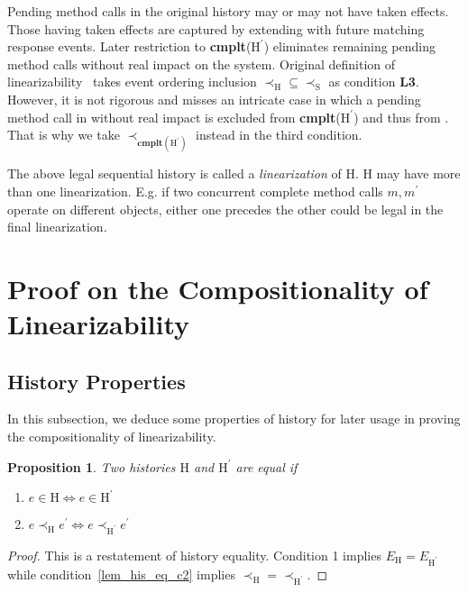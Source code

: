 \documentclass[a4paper,USenglish]{lipics-v2016}
\newtheorem{prop}[theorem]{Proposition}
\newcommand{\lin}{linearizability}
\newcommand{\linz}{linearization}
\newcommand{\cmplt}{\textbf{cmplt}}
\newcommand{\his}{\text{H}}
\newcommand{\shis}{\text{S}}
\newcommand{\evts}{\textit{E}}
\begin{document}
Pending method calls in the original history may or may not have taken effects.
Those having taken effects are captured by extending {\his} with  future matching response events.
Later restriction to \cmplt($\his^\prime$) eliminates remaining pending method calls without real impact on the system.
Original definition of {\lin}~\cite{Herlihy90} takes event ordering inclusion $\prec_{\his} \subseteq \prec_{\shis}$
as condition \textbf{L3}.
However, it is not rigorous and misses an intricate case in which a pending method call in {\his} without real impact
is excluded from \cmplt($\his^\prime$) and thus from {\shis}.
That is why we take $\prec_{\cmplt(\his^\prime)}$ instead in the third condition.

The above legal sequential history {\shis} is called a \textit{\linz} of $\his$.
$\his$ may have more than one \linz.
E.g. if two concurrent complete method calls $m, m^\prime$ operate on different objects,
either one precedes the other could be legal in the final {\linz}.


\section{Proof on the Compositionality of Linearizability}\label{sec:comp}

\subsection{History Properties}\label{sec:hisproperty}
In this subsection, we deduce some properties of history for later usage in proving the compositionality of
linearizability.

\begin{prop}\label{lem_his_eq}
	Two histories $\his$ and $\his^\prime$ are equal if
	\begin{enumerate}[(1)]
		\item $e \in \his \iff e \in \his^\prime$
		\item\label{lem_his_eq_c2} $e \prec_{\his} e^\prime \iff e \prec_{\his^\prime} e^\prime$
	\end{enumerate}
\end{prop}
\begin{proof}
	This is a restatement of history equality.
	Condition 1 implies $\evts_{\his} = \evts_{\his^\prime}$ while condition~\ref{lem_his_eq_c2} implies $\prec_{\his} = \prec_{\his^\prime}$.
\end{proof}
\end{document}
